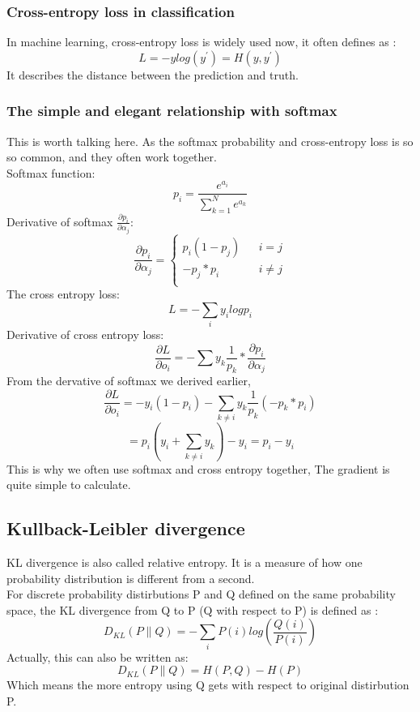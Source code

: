 \documentclass{article}
\begin{document}
\subsubsection{Cross-entropy loss in classification}
In machine learning, cross-entropy loss is widely used now, it often defines as : 
$$L=-ylog(y^{'})=H(y,y^{'})$$
It describes the distance between the prediction and truth.
\subsubsection{The simple and elegant relationship with softmax}
This is worth talking here. As the softmax probability and cross-entropy loss is so so common, and they often work together.\\
Softmax function:
$$p_{i}=\frac{e^{a_{i}}}{\sum_{k=1}^{N}e^{a_{k}}}$$
Derivative of softmax $\frac{\partial p_{i}}{\partial \alpha_{j}}$: \\
\begin{equation}
\frac{\partial p_{i}}{\partial \alpha_{j}}=\left\{
\begin{aligned}
p_{i}(1-p_{j}) & & i=j \\
-p_{j}*p_{i}  && i\neq j \\
\end{aligned}
\right.
\end{equation}
The cross entropy loss:
$$L=-\sum_{i}y_{i}logp_{i}$$
Derivative of cross entropy loss:
$$\frac{\partial L}{\partial o_{i}}=-\sum y_{k}\frac{1}{p_{k}}*\frac{\partial p_{i}}{\partial \alpha_{j}}$$
From the dervative of softmax we derived earlier,
$$\frac{\partial L}{\partial o_{i}}=-y_{i}(1-p_{i})-\sum_{k \neq i}y_{k}\frac{1}{p_{k}}(-p_{k}*p_{i})$$
$$=p_{i}(y_{i}+\sum _{k \neq i}y_{k})-y_{i}=p_{i}-y_{i}$$
This is why we often use softmax and cross entropy together, The gradient is quite simple to calculate. 
\subsection{Kullback-Leibler divergence}
KL divergence is also called relative entropy. It is a measure of how one probability distribution is different from a second.\\
For discrete probability distirbutions P and Q defined on the same probability space, the KL divergence from Q to P (Q with respect to P) is defined as :
$$D_{KL}(P \parallel Q)=-\sum_{i}P(i)log(\frac{Q(i)}{P(i)})$$
Actually, this can also be written as: 
$$D_{KL}(P \parallel Q)=H(P,Q)-H(P)$$
Which means the more entropy using Q gets with respect to original distirbution P.
\end{document}
